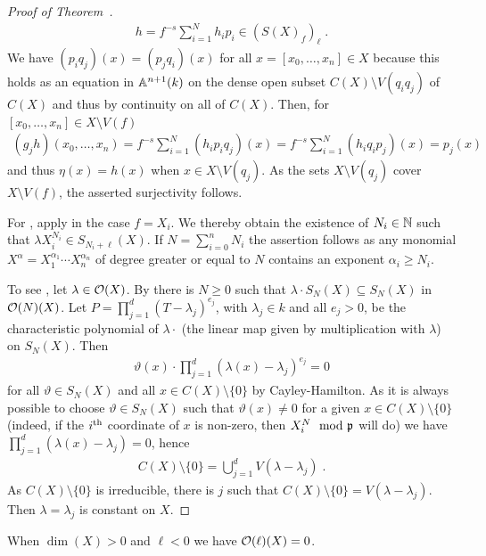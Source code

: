 \documentclass[a4paper,parskip=half,numbers=enddot, DIV=12]{scrreprt}
\begin{document}
\begin{proof}[Proof of Theorem~]
    \begin{align*}
    	h= f^{-s}\sum_{i=1}^N h_ip_i\in (S(X)_f)_\ell\;.
    \end{align*}
    We have $(p_i q_j)(x) = (p_jq_i)(x)$ for all $x=[x_0,\ldots,x_n]\in X$ because this holds as an equation in $\mathbb{A}^{n+1}(k)$ on the dense open subset $C(X)\setminus V(q_iq_j)$ of $C(X)$ and thus by continuity on all of $C(X)$. Then, for $[x_0,\ldots, x_n]\in X\setminus V(f)$ 
    \begin{align*}
        (g_jh)(x_0,\ldots, x_n) = f^{-s}\sum_{i=1}^N (h_ip_iq_j)(x)= f^{-s}\sum_{i=1}^N (h_iq_ip_j)(x) = p_j(x)
    \end{align*}
    and thus $\eta(x) = h(x)$ when $x\in X\setminus V(q_j)$. As the sets $X\setminus V(q_j)$ cover $X\setminus V(f)$, the asserted surjectivity follows.
    
    For , apply  in the case $f=X_i$. We thereby obtain the existence of $N_i\in\mathbb{N}$ such that $\lambda X_i^{N_i}\in S_{N_i+\ell}(X)$. If $N = \sum_{i=0}^n N_i$ the assertion follows as any monomial $X^\alpha=X_1^{\alpha_1}\cdots X_n^{\alpha_n}$ of degree greater or equal to $N$ contains an exponent $\alpha_i\geq N_i$.
    
    To see , let $\lambda\in \mathcal{O}(X)$. By  there is $N\geq 0$ such that $\lambda\cdot S_N(X) \subseteq S_N(X)$ in $\mathcal{O}(N)(X)$. Let $P = \prod_{j=1}^d (T-\lambda_j)^{e_j}$, with $\lambda_j\in k$ and all $e_j>0$, be the characteristic polynomial of $\lambda\cdot$ (the linear map given by multiplication with $\lambda$) on $S_N(X)$. Then 
    \begin{align*}
    	 \vartheta(x)\cdot\prod_{j=1}^d (\lambda(x)-\lambda_j)^{e_j} = 0
    \end{align*}
   for all $\vartheta\in S_N(X)$ and all $x\in C(X)\setminus \{0\}$ by Cayley-Hamilton. As it is always possible to choose $\vartheta\in S_N(X)$ such that $\vartheta(x)\neq0$ for a given $x\in C(X)\setminus\{0\}$ (indeed, if the $i^{\text{th}}$ coordinate of $x$ is non-zero, then $X_i^N\mod{\mathfrak{p}}$ will do) we have $\prod_{j=1}^d (\lambda(x)-\lambda_j) = 0$, hence 
   \begin{align*}
   	C(X)\setminus \{0\} = \bigcup_{j=1}^d V(\lambda-\lambda_j)\;. 
   \end{align*}
   As $C(X)\setminus \{0\}$ is irreducible, there is $j$ such that $C(X)\setminus\{0\} = V(\lambda-\lambda_j)$. Then $\lambda=\lambda_j$ is constant on $X$. 
\end{proof}
\begin{cor}
    When $\dim(X) >0$ and $\ell<0$ we have $\mathcal{O}(\ell)(X) = 0$.
\end{cor}
\end{document}
